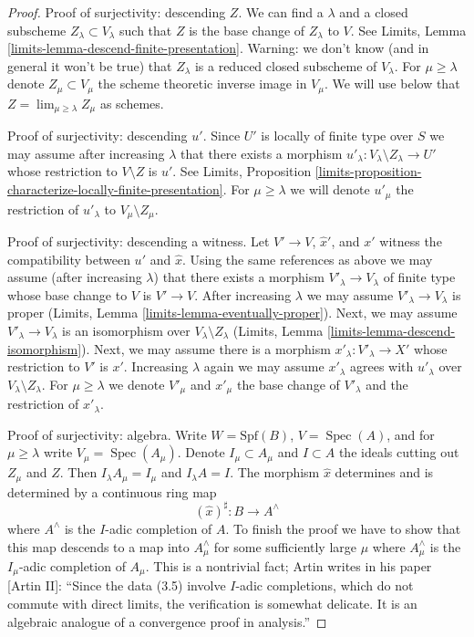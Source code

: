 \documentclass{stacks-project}
\theoremstyle{plain}
\theoremstyle{definition}
\theoremstyle{remark}
\numberwithin{equation}{subsection}
\def\lim{\mathop{\mathrm{lim}}\nolimits}
\def\Spec{\mathop{\mathrm{Spec}}}
\begin{document}
\begin{proof}
\medskip\noindent
Proof of surjectivity: descending $Z$. We can find a $\lambda$
and a closed subscheme $Z_\lambda \subset V_\lambda$ such that
$Z$ is the base change of $Z_\lambda$ to $V$. See
Limits, Lemma \ref{limits-lemma-descend-finite-presentation}.
Warning: we don't know (and in general it won't be true)
that $Z_\lambda$ is a reduced closed subscheme of $V_\lambda$.
For $\mu \geq \lambda$ denote $Z_\mu \subset V_\mu$ the scheme theoretic
inverse image in $V_\mu$. We will use below that
$Z = \lim_{\mu \geq \lambda} Z_\mu$ as schemes.

\medskip\noindent
Proof of surjectivity: descending $u'$.
Since $U'$ is locally of finite type over $S$
we may assume after increasing $\lambda$
that there exists a morphism
$u'_\lambda : V_\lambda \setminus Z_\lambda \to U'$
whose restriction to $V \setminus Z$ is $u'$.
See Limits, Proposition
\ref{limits-proposition-characterize-locally-finite-presentation}.
For $\mu \geq \lambda$ we will denote $u'_\mu$ the restriction
of $u'_\lambda$ to $V_\mu \setminus Z_\mu$.

\medskip\noindent
Proof of surjectivity: descending a witness.
Let $V' \to V$, $\hat x'$, and $x'$ witness the compatibility between
$u'$ and $\hat x$. Using the same references as above we may assume
(after increasing $\lambda$) that there exists a morphism
$V'_\lambda \to V_\lambda$ of finite type whose base change to $V$
is $V' \to V$. After increasing $\lambda$ we may assume
$V'_\lambda \to V_\lambda$ is proper
(Limits, Lemma \ref{limits-lemma-eventually-proper}).
Next, we may assume $V'_\lambda \to V_\lambda$ is an isomorphism
over $V_\lambda \setminus Z_\lambda$
(Limits, Lemma \ref{limits-lemma-descend-isomorphism}).
Next, we may assume there is a morphism $x'_\lambda : V'_\lambda \to X'$
whose restriction to $V'$ is $x'$.
Increasing $\lambda$ again we may assume $x'_\lambda$
agrees with $u'_\lambda$ over $V_\lambda \setminus Z_\lambda$.
For $\mu \geq \lambda$ we denote
$V'_\mu$ and $x'_\mu$ the base change of $V'_\lambda$ and the
restriction of $x'_\lambda$.

\medskip\noindent
Proof of surjectivity: algebra.
Write $W = \text{Spf}(B)$, $V = \Spec(A)$, and
for $\mu \geq \lambda$ write $V_\mu = \Spec(A_\mu)$.
Denote $I_\mu \subset A_\mu$ and $I \subset A$
the ideals cutting out $Z_\mu$ and $Z$.
Then $I_\lambda A_\mu = I_\mu$ and $I_\lambda A = I$.
The morphism $\hat x$ determines and is determined by a
continuous ring map
$$
(\hat x)^\sharp : B \longrightarrow A^\wedge
$$
where $A^\wedge$ is the $I$-adic completion of $A$.
To finish the proof we have to show that this map descends to a map into
$A_\mu^\wedge$ for some sufficiently large $\mu$ where $A_\mu^\wedge$
is the $I_\mu$-adic completion of $A_\mu$.
This is a nontrivial fact; Artin writes in his paper
[Artin II]: ``Since the data (3.5) involve $I$-adic completions,
which do not commute with direct limits, the verification is somewhat
delicate. It is an algebraic analogue of a convergence proof in analysis.''


\end{proof}
\end{document}
